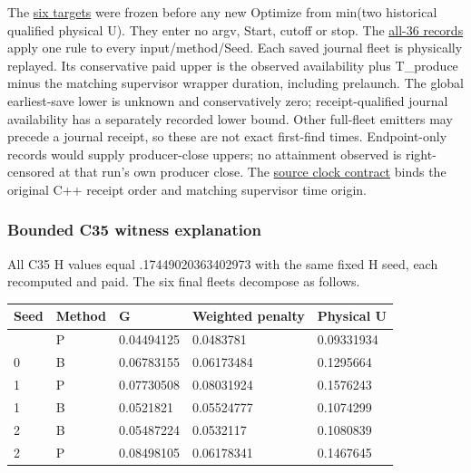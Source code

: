 \documentclass[
  american,
  11pt,
]{article}
\newcounter{none} %
\begin{document}
The
\href{https://github.com/yifanXovo/TailoredExact/blob/codex/round172-journal-manuscript/results/unified_exact_round164/primal_targets_frozen.json}{six
targets} were frozen before any new Optimize from min(two historical
qualified physical U). They enter no argv, Start, cutoff or stop. The
\href{https://github.com/yifanXovo/TailoredExact/blob/codex/round172-journal-manuscript/results/unified_exact_round164/reports/primal_target_arrival.json}{all-36
records} apply one rule to every input/method/Seed. Each saved journal
fleet is physically replayed. Its conservative paid upper is the
observed availability plus T\_\allowbreak{}produce minus the matching supervisor
wrapper duration, including prelaunch. The global earliest-save lower is
unknown and conservatively zero; receipt-qualified journal availability
has a separately recorded lower bound. Other full-fleet emitters may
precede a journal receipt, so these are not exact first-find times.
Endpoint-only records would supply producer-close uppers; no attainment
observed is right-censored at that run's own producer close. The
\href{https://github.com/yifanXovo/TailoredExact/blob/codex/round172-journal-manuscript/results/unified_exact_round164/target_clock_contract.json}{source
clock contract} binds the original C++ receipt order and matching
supervisor time origin.

\subsubsection{Bounded C35 witness
explanation}\label{bounded-c35-witness-explanation}

All C35 H values equal .17449020363402973 with the same fixed H seed,
each recomputed and paid. The six final fleets decompose as follows.

\Needspace{226pt}

{\def\LTcaptype{none} %
\begin{longtable}[]{@{}lllll@{}}
\toprule\noalign{}
Seed & Method & G & Weighted penalty & Physical U \\
\midrule\noalign{}
\endhead
\bottomrule\noalign{}
\endlastfoot
0 & P & 0.04494125 & 0.0483781 & 0.09331934 \\
0 & B & 0.06783155 & 0.06173484 & 0.1295664 \\
1 & P & 0.07730508 & 0.08031924 & 0.1576243 \\
1 & B & 0.0521821 & 0.05524777 & 0.1074299 \\
2 & B & 0.05487224 & 0.0532117 & 0.1080839 \\
2 & P & 0.08498105 & 0.06178341 & 0.1467645 \\
\end{longtable}
}
\end{document}
